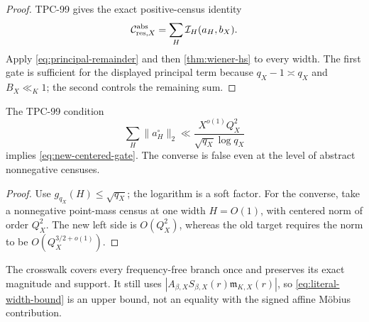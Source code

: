 \begin{proof}
TPC-99 gives the exact positive-census identity
\[
 \mathcal C_{\mathrm{res},X}^{\mathrm{abs}}
 =
 \sum_H\mathcal I_H(a_H,b_X).
\]
Apply \eqref{eq:principal-remainder} and then
\cref{thm:wiener-hs} to every width.  The first gate is sufficient
for the displayed principal term because \(q_X-1\asymp q_X\) and
\(B_X\ll_K1\); the second controls the remaining sum.
\end{proof}

\begin{corollary}
\label{cor:old-implies-new}
The TPC-99 condition
\[
 \sum_H\|a_H^\circ\|_2
 \ll
 \frac{X^{o(1)}Q_X^2}{\sqrt{q_X}\log q_X}
\]
implies \eqref{eq:new-centered-gate}.  The converse is false even at
the level of abstract nonnegative censuses.
\end{corollary}

\begin{proof}
Use \(g_{q_X}(H)\le\sqrt{q_X}\); the logarithm is a soft factor.  For
the converse, take a nonnegative point-mass census at one width
\(H=O(1)\), with centered norm of order \(Q_X^2\).  The new left
side is \(O(Q_X^2)\),
whereas the old target requires the norm to be
\(O(Q_X^{3/2+o(1)})\).
\end{proof}

\begin{remark}
The crosswalk covers every frequency-free branch once and preserves
its exact magnitude and support.  It still uses
\(|A_{\beta,X}S_{\beta,X}(r)\mathfrak m_{K,X}(r)|\), so
\eqref{eq:literal-width-bound} is an upper bound, not an equality
with the signed affine M\"obius contribution.
\end{remark}
